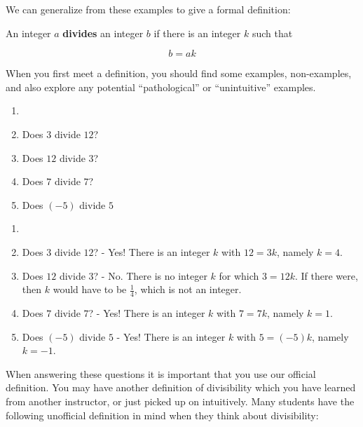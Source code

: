 We can generalize from these examples to give a formal definition:

\medskip

\begin{definition}
	An integer $a$ \textbf{divides} an integer $b$ if there is an integer $k$ such that
	
	$$
	b = ak
	$$
\end{definition}

When you first meet a definition, you should find some examples, non-examples, and also explore any potential ``pathological'' or ``unintuitive'' examples.  

\begin{xca}
	\begin{enumerate}
		\item[]\mbox{}\\
		\item Does $3$ divide $12$? 
		\item Does $12$ divide $3$?  
		\item Does $7$ divide $7$? 
		\item Does $(-5)$ divide  $5$  
	\end{enumerate}
\end{xca}

\begin{solutions}
	\begin{enumerate}
		\item[]\mbox{}\\
		\item Does $3$ divide $12$?  - Yes!  There is an integer $k$ with $12 = 3k$, namely $k=4$. 
		\item Does $12$ divide $3$?  - No.  There is no integer $k$ for which $3 = 12k$.  If there were, then $k$ would have to be $\frac{1}{4}$, which is not an integer.
		\item Does $7$ divide $7$?  - Yes!  There is an integer $k$ with $7 = 7k$, namely $k=1$. 
		\item Does $(-5)$ divide  $5$  - Yes!  There is an integer $k$ with $5 = (-5)k$, namely $k=-1$.
	\end{enumerate}
\end{solutions}

When answering these questions it is important that you use our official definition.  You may have another definition of divisibility which you have learned from another instructor, or just picked up on intuitively.  Many students have the following unofficial definition in mind when they think about divisibility:


